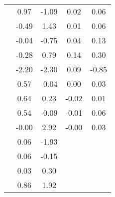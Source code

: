 \begin{table}
\begin{tabular}{c|cc|cc|}
\multicolumn{1}{|c|}{} & \multicolumn{1}{|c|}{      0.97} & \multicolumn{1}{|c|}{     -1.09} & \multicolumn{1}{|c|}{      0.02} & \multicolumn{1}{|c|}{      0.06} \\ 
\multicolumn{1}{|c|}{} & \multicolumn{1}{|c|}{     -0.49} & \multicolumn{1}{|c|}{      1.43} & \multicolumn{1}{|c|}{      0.01} & \multicolumn{1}{|c|}{      0.06} \\ 
\multicolumn{1}{|c|}{} & \multicolumn{1}{|c|}{     -0.04} & \multicolumn{1}{|c|}{     -0.75} & \multicolumn{1}{|c|}{      0.04} & \multicolumn{1}{|c|}{      0.13} \\ 
\multicolumn{1}{|c|}{} & \multicolumn{1}{|c|}{     -0.28} & \multicolumn{1}{|c|}{      0.79} & \multicolumn{1}{|c|}{      0.14} & \multicolumn{1}{|c|}{      0.30} \\ 
\multicolumn{1}{|c|}{} & \multicolumn{1}{|c|}{     -2.20} & \multicolumn{1}{|c|}{     -2.30} & \multicolumn{1}{|c|}{      0.09} & \multicolumn{1}{|c|}{     -0.85} \\ 
\multicolumn{1}{|c|}{} & \multicolumn{1}{|c|}{      0.57} & \multicolumn{1}{|c|}{     -0.04} & \multicolumn{1}{|c|}{      0.00} & \multicolumn{1}{|c|}{      0.03} \\ 
\multicolumn{1}{|c|}{} & \multicolumn{1}{|c|}{      0.64} & \multicolumn{1}{|c|}{      0.23} & \multicolumn{1}{|c|}{     -0.02} & \multicolumn{1}{|c|}{      0.01} \\ 
\multicolumn{1}{|c|}{} & \multicolumn{1}{|c|}{      0.54} & \multicolumn{1}{|c|}{     -0.09} & \multicolumn{1}{|c|}{     -0.01} & \multicolumn{1}{|c|}{      0.06} \\ 
\multicolumn{1}{|c|}{} & \multicolumn{1}{|c|}{     -0.00} & \multicolumn{1}{|c|}{      2.92} & \multicolumn{1}{|c|}{     -0.00} & \multicolumn{1}{|c|}{      0.03} \\ 
\multicolumn{1}{|c|}{} & \multicolumn{1}{|c|}{      0.06} & \multicolumn{1}{|c|}{     -1.93} & \multicolumn{1}{|c|}{} & \multicolumn{1}{|c|}{} \\ 
\multicolumn{1}{|c|}{} & \multicolumn{1}{|c|}{      0.06} & \multicolumn{1}{|c|}{     -0.15} & \multicolumn{1}{|c|}{} & \multicolumn{1}{|c|}{} \\ 
\multicolumn{1}{|c|}{} & \multicolumn{1}{|c|}{      0.03} & \multicolumn{1}{|c|}{      0.30} & \multicolumn{1}{|c|}{} & \multicolumn{1}{|c|}{} \\ 
\multicolumn{1}{|c|}{} & \multicolumn{1}{|c|}{      0.86} & \multicolumn{1}{|c|}{      1.92} & \multicolumn{1}{|c|}{} & \multicolumn{1}{|c|}{} \\ 

\end{tabular}
\end{table}
